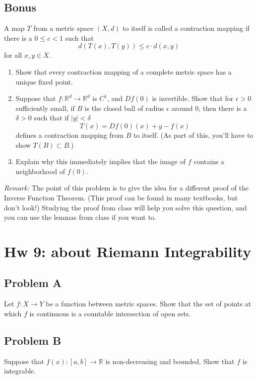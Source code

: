 \documentclass[lang=cn,11pt]{template}
\begin{document}
\section*{Bonus}
A map \( T \) from a metric space \( (X, d) \) to itself is called a contraction mapping if there is a \( 0 \leq c < 1 \) such that
\[
d(T(x), T(y)) \leq c \cdot d(x, y)
\]
for all \( x, y \in X \).

\begin{enumerate}
    \item Show that every contraction mapping of a complete metric space has a unique fixed point.
    \item Suppose that \( f : \mathbb{R}^d \to \mathbb{R}^d \) is \( C^1 \), and \( Df(0) \) is invertible. Show that for \( \epsilon > 0 \) sufficiently small, if \( B \) is the closed ball of radius \( \epsilon \) around 0, then there is a \( \delta > 0 \) such that if \( |y| < \delta \)
    \[
    T(x) = Df(0)(x) + y - f(x)
    \]
    defines a contraction mapping from \( B \) to itself. (As part of this, you’ll have to show \( T(B) \subset B \).)
    \item Explain why this immediately implies that the image of \( f \) contains a neighborhood of \( f(0) \).
\end{enumerate}

\textit{Remark:} The point of this problem is to give the idea for a different proof of the Inverse Function Theorem. (This proof can be found in many textbooks, but don’t look!) Studying the proof from class will help you solve this question, and you can use the lemmas from class if you want to.






\chapter*{Hw 9: about Riemann Integrability}

\section*{Problem A}
Let $f : X \to Y$ be a function between metric spaces. Show that the set of points at which $f$ is continuous is a countable intersection of open sets.

\section*{Problem B}
Suppose that $f(x) : [a, b] \to \mathbb{R}$ is non-decreasing and bounded. Show that $f$ is integrable.
\end{document}
